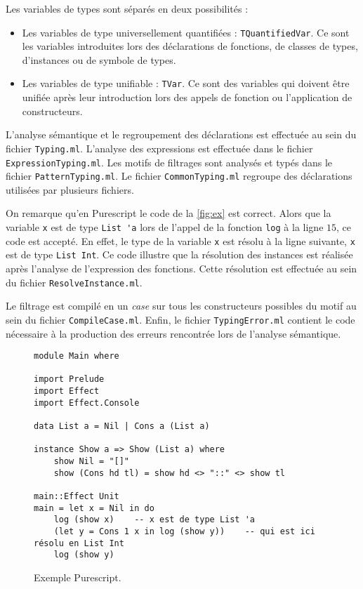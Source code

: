 \documentclass[french, 12pt]{article}
\newcommand{\ps}{\textsf{Purescript}}
\begin{document}
Les variables de types sont séparés en deux possibilités :
\begin{itemize}
    \item Les variables de type universellement quantifiées : \verb|TQuantifiedVar|.
          Ce sont les variables introduites lors des déclarations de fonctions,
          de classes de types, d'instances ou de symbole de types.
    \item Les variables de type unifiable : \verb|TVar|. Ce sont des variables
          qui doivent être unifiée après leur introduction lors des appels de
          fonction ou l'application de constructeurs.
\end{itemize}

L'analyse sémantique et le regroupement des déclarations est effectuée au sein
du fichier \verb|Typing.ml|. L'analyse des expressions est effectuée dans le
fichier \verb|ExpressionTyping.ml|. Les motifs de filtrages sont analysés et
typés dans le fichier \verb|PatternTyping.ml|. Le fichier \verb|CommonTyping.ml|
regroupe des déclarations utilisées par plusieurs fichiers.

On remarque qu'en \ps{} le code de la \autoref{fig:ex} est correct. Alors que
la variable \verb|x| est de type \verb|List 'a| lors de l'appel de la fonction
\verb|log| à la ligne $15$, ce code est accepté. En effet, le type de la
variable \verb|x| est résolu à la ligne suivante, \verb|x| est de type
\verb|List Int|. Ce code illustre que la résolution des instances est réalisée
après l'analyse de l'expression des fonctions. Cette résolution est effectuée
au sein du fichier \verb|ResolveInstance.ml|.

Le filtrage est compilé en un \emph{case} sur tous les constructeurs possibles
du motif au sein du fichier \verb|CompileCase.ml|. Enfin, le fichier
\verb|TypingError.ml| contient le code nécessaire à la production des erreurs
rencontrée lors de l'analyse sémantique.

\begin{figure}[H]
    \begin{verbatim}
module Main where

import Prelude
import Effect
import Effect.Console

data List a = Nil | Cons a (List a)

instance Show a => Show (List a) where
    show Nil = "[]"
    show (Cons hd tl) = show hd <> "::" <> show tl

main::Effect Unit
main = let x = Nil in do
    log (show x)    -- x est de type List 'a
    (let y = Cons 1 x in log (show y))    -- qui est ici résolu en List Int
    log (show y)
    \end{verbatim}
    \caption{Exemple \ps{}.}
    \label{fig:ex}
\end{figure}
\end{document}
